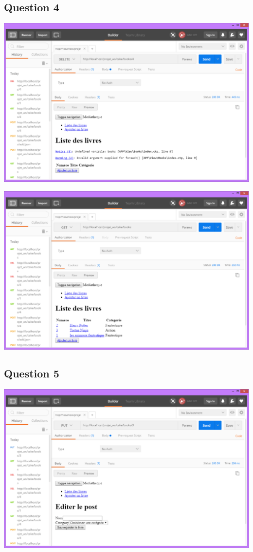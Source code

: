 \documentclass{report}
\begin{document}
		\subsection{Question 4}
		\begin{center}
			\includegraphics[scale=0.4]{img/resultats/q4,1.png} 
		\end{center} 
		\begin{center}
			\includegraphics[scale=0.4]{img/resultats/q4,2.png} 
		\end{center}
		\subsection{Question 5}
		\begin{center}
			\includegraphics[scale=0.4]{img/resultats/q5.png} 
		\end{center} 
\end{document}
